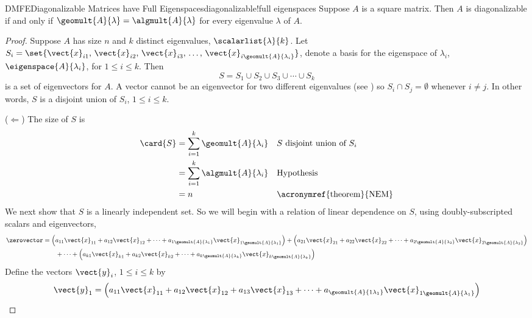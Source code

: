 %
\begin{theorem}{DMFE}{Diagonalizable Matrices have Full Eigenspaces}{diagonalizable!full eigenspaces}
Suppose $A$ is a square matrix.  Then $A$ is diagonalizable if and only if $\geomult{A}{\lambda}=\algmult{A}{\lambda}$ for every eigenvalue $\lambda$ of $A$.
\end{theorem}
%
\begin{proof}
Suppose $A$ has size $n$ and $k$ distinct eigenvalues, $\scalarlist{\lambda}{k}$.  Let $S_i=\set{\vect{x}_{i1},\,\vect{x}_{i2},\,\vect{x}_{i3},\,\ldots,\,\vect{x}_{i\geomult{A}{\lambda_i}}}$,  denote a basis for the eigenspace of $\lambda_i$, $\eigenspace{A}{\lambda_i}$,  for $1\leq i\leq k$.  Then
%
\begin{equation*}
S=S_1\cup S_2\cup S_3\cup\cdots\cup S_k
\end{equation*}
%
is a set of eigenvectors for $A$.  A vector cannot be an eigenvector for two different eigenvalues (see ) so $S_i\cap S_j=\emptyset$ whenever $i\neq j$.  In other words, $S$ is a disjoint union of $S_i$, $1\leq i\leq k$.\par
%
($\Leftarrow$)  The size of $S$ is
%
\begin{align*}
\card{S}
&=\sum_{i=1}^k\geomult{A}{\lambda_i}&&\text{$S$ disjoint union of $S_i$}\\
&=\sum_{i=1}^k\algmult{A}{\lambda_i}&&\text{Hypothesis}\\
&=n&&\text{\acronymref{theorem}{NEM}}
\end{align*}
%
We next show that $S$ is a linearly independent set.  So we will begin with a relation of linear dependence on $S$, using doubly-subscripted scalars and eigenvectors,
%
\begin{align*}
\zerovector&=
\left(a_{11}\vect{x}_{11}+a_{12}\vect{x}_{12}+\cdots+a_{1\geomult{A}{\lambda_1}}\vect{x}_{1\geomult{A}{\lambda_1}}\right)+
\left(a_{21}\vect{x}_{21}+a_{22}\vect{x}_{22}+\cdots+a_{2\geomult{A}{\lambda_2}}\vect{x}_{2\geomult{A}{\lambda_2}}\right)\\
&\quad\quad+\cdots+
\left(a_{k1}\vect{x}_{k1}+a_{k2}\vect{x}_{k2}+\cdots+a_{k\geomult{A}{\lambda_k}}\vect{x}_{k\geomult{A}{\lambda_k}}\right)
%
\end{align*}
%
Define the vectors $\vect{y}_i$, $1\leq i\leq k$ by
%
\begin{align*}
\vect{y}_1&=\left(a_{11}\vect{x}_{11}+a_{12}\vect{x}_{12}+a_{13}\vect{x}_{13}+\cdots+a_{\geomult{A}{1\lambda_1}}\vect{x}_{1\geomult{A}{\lambda_1}}\right)\\

\end{align*}
\end{proof}
